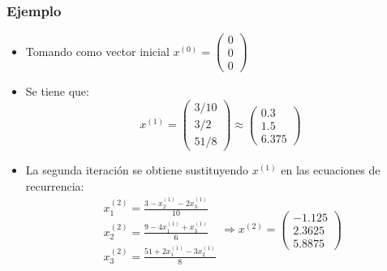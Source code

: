 \documentclass[10pt]{beamer}
\begin{document}
  \begin{frame}
    \frametitle{Ejemplo}
    \begin{itemize}
      \item Tomando como vector inicial $x^{(0)} = \left(\begin{array}{c}
      0\\
      0\\
      0
      \end{array}\right)$
      \item<2-> Se tiene que:
      $$
      x^{(1)} = \left(\begin{array}{c}
        3/10\\
        3/2\\
        51/8
        \end{array}\right)\approx
      \left(\begin{array}{c}
      0.3\\
      1.5\\
      6.375
      \end{array}\right)
      $$
      \item<3-> La segunda iteraci\'on se obtiene sustituyendo $x^{(1)}$ en las ecuaciones de recurrencia:
      $$
      \begin{array}{c}
        x_1^{(2)} = \displaystyle\frac{3-x_2^{(1)}-2x_3^{(1)}}{10}\\
        x_2^{(2)} = \displaystyle\frac{9-4x_1^{(1)}+x_3^{(1)}}{6}\\
        x_3^{(2)} = \displaystyle\frac{51+2x_1^{(1)}-3x_2^{(1)}}{8}
      \end{array} \Rightarrow x^{(2)} = \left(\begin{array}{c}
      -1.125\\
      2.3625\\
      5.8875
      \end{array}\right)
      $$
    \end{itemize}
  \end{frame}
\end{document}
